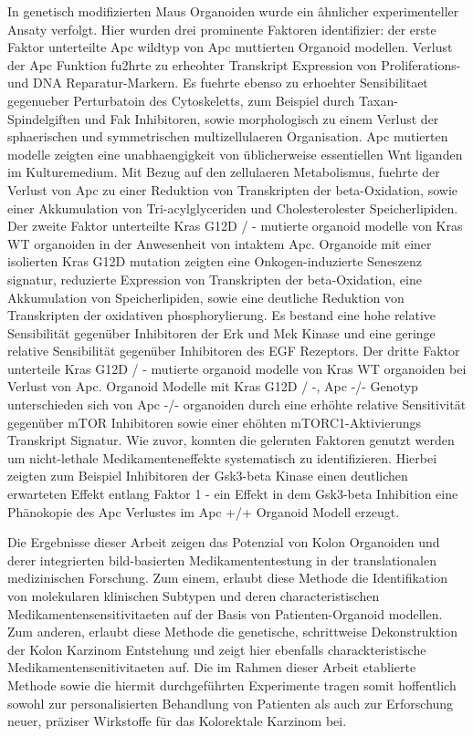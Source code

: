 In genetisch modifizierten Maus Organoiden wurde ein âhnlicher experimenteller Ansaty verfolgt. Hier wurden drei prominente Faktoren identifizier: der erste Faktor unterteilte Apc wildtyp von Apc muttierten Organoid modellen. Verlust der Apc Funktion fu2hrte zu erheohter Transkript Expression von Proliferations- und DNA Reparatur-Markern. Es fuehrte ebenso zu erhoehter Sensibilitaet gegenueber Perturbatoin des Cytoskeletts, zum Beispiel durch Taxan-Spindelgiften und Fak Inhibitoren, sowie morphologisch zu einem Verlust der sphaerischen und symmetrischen multizellulaeren Organisation. Apc mutierten modelle zeigten eine unabhaengigkeit von üblicherweise essentiellen Wnt liganden im Kulturemedium. Mit Bezug auf den zellulaeren Metabolismus, fuehrte der Verlust von Apc zu einer Reduktion von Transkripten der beta-Oxidation, sowie einer Akkumulation von Tri-acylglyceriden und Cholesterolester Speicherlipiden.
Der zweite Faktor unterteilte Kras G12D / - mutierte organoid modelle von Kras WT organoiden in der Anwesenheit von intaktem Apc. Organoide mit einer isolierten Kras G12D mutation zeigten eine Onkogen-induzierte Seneszenz signatur, reduzierte  Expression von Transkripten der beta-Oxidation, eine Akkumulation von Speicherlipiden, sowie eine deutliche Reduktion von Transkripten der oxidativen phosphorylierung. Es bestand eine hohe relative Sensibilität gegenüber Inhibitoren der Erk und Mek Kinase und eine geringe relative Sensibilität gegenüber Inhibitoren des EGF Rezeptors. 
Der dritte Faktor unterteile Kras G12D / - mutierte organoid modelle von Kras WT organoiden bei Verlust von Apc. Organoid Modelle mit  Kras G12D / -, Apc -/- Genotyp unterschieden sich von  Apc -/- organoiden durch eine erhöhte relative Sensitivität gegenüber mTOR Inhibitoren sowie einer ehöhten mTORC1-Aktivierungs Transkript Signatur.
Wie zuvor, konnten die gelernten Faktoren genutzt werden um nicht-lethale Medikamenteneffekte systematisch zu identifizieren. Hierbei zeigten zum Beispiel Inhibitoren der Gsk3-beta Kinase einen deutlichen erwarteten Effekt entlang Faktor 1 - ein Effekt in dem Gsk3-beta Inhibition eine Phänokopie des Apc Verlustes im Apc +/+ Organoid Modell erzeugt.

Die Ergebnisse dieser Arbeit zeigen das Potenzial von Kolon Organoiden und derer integrierten bild-basierten Medikamententestung in der translationalen medizinischen Forschung. Zum einem, erlaubt diese Methode die Identifikation von molekularen klinischen Subtypen und deren characteristischen Medikamentensensitivitaeten auf der Basis von Patienten-Organoid modellen. Zum anderen, erlaubt diese Methode die genetische, schrittweise Dekonstruktion der Kolon Karzinom Entstehung und zeigt hier ebenfalls charackteristische Medikamentensenitivitaeten auf. Die im Rahmen dieser Arbeit etablierte Methode sowie die hiermit durchgeführten Experimente tragen somit hoffentlich sowohl zur personalisierten Behandlung von Patienten als auch zur Erforschung neuer, präziser Wirkstoffe für das Kolorektale Karzinom bei.